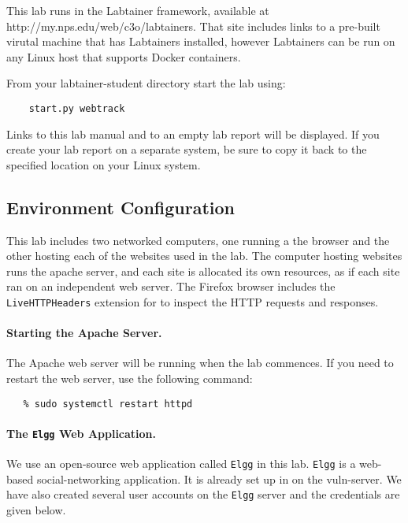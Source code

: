
This lab runs in the Labtainer framework,
available at http://my.nps.edu/web/c3o/labtainers.
That site includes links to a pre-built virutal machine
that has Labtainers installed, however Labtainers can
be run on any Linux host that supports Docker containers.

From your labtainer-student directory start the lab using:
\begin{verbatim}
    start.py webtrack
\end{verbatim}
Links to this lab manual and to an empty lab report will be displayed.  If you create your lab report on a separate system,
be sure to copy it back to the specified location on your Linux system.

\subsection{Environment Configuration}
This lab includes two networked computers, one running a the browser
and the other hosting each of the websites used in the lab. The computer
hosting websites runs the apache server, and each site is allocated its 
own resources, as if each site ran on an independent web server.
The Firefox browser includes the  \texttt{LiveHTTPHeaders} extension for 
to inspect the HTTP requests and responses.  


\paragraph{Starting the Apache Server.}
The Apache web server will be running when the lab
commences.  If you need to restart the web server, use
the following command:
\begin{verbatim}
   % sudo systemctl restart httpd
\end{verbatim}

\paragraph{The {\tt Elgg} Web Application.}
We use an open-source web application called {\tt Elgg} in this lab.
{\tt Elgg} is a web-based social-networking application. 
It is already set up in on the vuln-server.
We have also created several user accounts on the {\tt Elgg} server and the credentials are given below.


